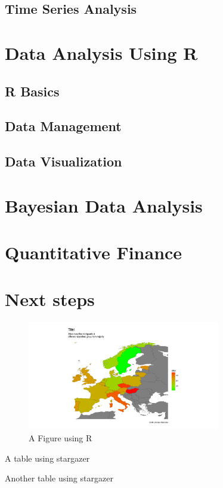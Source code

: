 \documentclass[14pt, a4paper]{article}
\begin{document}
\subsection{Time Series Analysis}


\section{Data Analysis Using R}
\subsection{R Basics}
\subsection{Data Management}
\subsection{Data Visualization}


\section{Bayesian Data Analysis}


\section{Quantitative Finance}


\section{Next steps}







\begin{figure}
\caption{A Figure using R}
\centering
\includegraphics[width=0.75\textwidth]{results/figures/a3.pdf}
\end{figure}



\begin{table}
\begin{scriptsize}
%
\end{scriptsize}
\caption{A table using stargazer}
\end{table}

\begin{table}
\begin{scriptsize}
%
\end{scriptsize}
\caption{Another table using stargazer}
\end{table}

\newpage

\printbibliography
\end{document}
